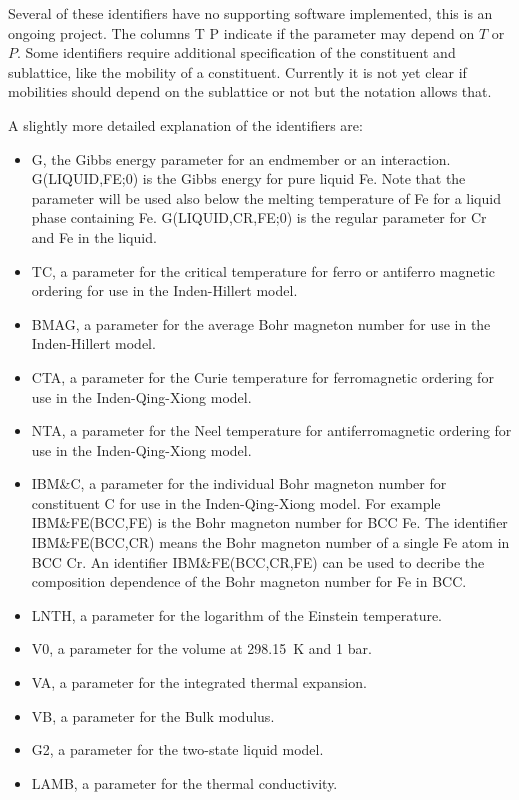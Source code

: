 \documentclass[11pt]{article}
\begin{document}
Several of these identifiers have no supporting software implemented,
this is an ongoing project.  The columns T P indicate if the parameter
may depend on $T$ or $P$.  Some identifiers require additional
specification of the constituent and sublattice, like the mobility of
a constituent.  Currently it is not yet clear if mobilities should
depend on the sublattice or not but the notation allows that.

A slightly more detailed explanation of the identifiers are:

\begin{itemize}
\item G, the Gibbs energy parameter for an endmember or an
  interaction.  G(LIQUID,FE;0) is the Gibbs energy for pure liquid Fe.
  Note that the parameter will be used also below the melting
  temperature of Fe for a liquid phase containing Fe.  G(LIQUID,CR,FE;0)
  is the regular parameter for Cr and Fe in the liquid.
\item TC, a parameter for the critical temperature for ferro or
  antiferro magnetic ordering for use in the Inden-Hillert model.
\item BMAG, a parameter for the average Bohr magneton number for use
  in the Inden-Hillert model.
\item CTA, a parameter for the Curie temperature for ferromagnetic
  ordering for use in the Inden-Qing-Xiong model.
\item NTA, a parameter for the Neel temperature for antiferromagnetic
  ordering for use in the Inden-Qing-Xiong model.
\item IBM\&C, a parameter for the individual Bohr magneton number for
  constituent C for use in the Inden-Qing-Xiong model.  For example
  IBM\&FE(BCC,FE) is the Bohr magneton number for BCC Fe.  The
  identifier IBM\&FE(BCC,CR) means the Bohr magneton number of a
  single Fe atom in BCC Cr.  An identifier IBM\&FE(BCC,CR,FE) can be
  used to decribe the composition dependence of the Bohr magneton
  number for Fe in BCC.
\item LNTH, a parameter for the logarithm of the Einstein temperature.
\item V0, a parameter for the volume at 298.15~K and 1 bar.
\item VA, a parameter for the integrated thermal expansion.
\item VB, a parameter for the Bulk modulus.
\item G2, a parameter for the two-state liquid model.
\item LAMB, a parameter for the thermal conductivity.

\end{itemize}
\end{document}
